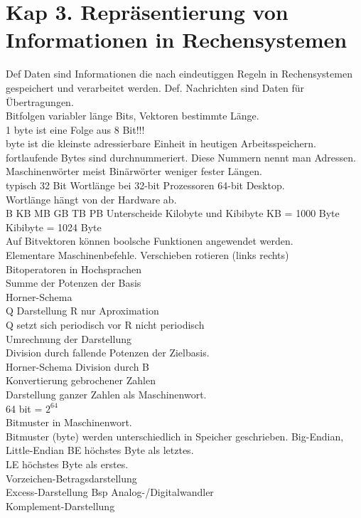\documentclass{article}
\begin{document}
	\section*{Kap 3. Repräsentierung von Informationen in Rechensystemen}
	Def Daten sind Informationen die nach eindeutiggen Regeln in Rechensystemen gespeichert und verarbeitet werden. 
	Def. Nachrichten sind Daten für Übertragungen.\\
	Bitfolgen variabler länge Bits, Vektoren bestimmte Länge. \\
	1 byte ist eine Folge aus 8 Bit!!! \\
	byte ist die kleinste adressierbare Einheit in heutigen Arbeitsspeichern. \\
	fortlaufende Bytes sind durchnummeriert. Diese Nummern nennt man Adressen. \\
	Maschinenwörter meist Binärwörter weniger fester Längen. \\
	typisch 32 Bit Wortlänge bei 32-bit Prozessoren 64-bit Desktop. \\
	Wortlänge hängt von der Hardware ab. \\
	B KB MB GB TB PB
	Unterscheide Kilobyte und Kibibyte
	KB = 1000 Byte Kibibyte = 1024 Byte \\
	Auf Bitvektoren können boolsche Funktionen angewendet werden. \\
	Elementare Maschinenbefehle. Verschieben rotieren (links rechts) \\
	Bitoperatoren in Hochsprachen \\

	Summe der Potenzen der Basis \\
	Horner-Schema \\
	Q Darstellung R nur Aproximation \\
	Q setzt sich periodisch vor R nicht periodisch \\
	Umrechnung der Darstellung \\
	Division durch fallende Potenzen der Zielbasis. \\
	Horner-Schema Division durch B \\
	Konvertierung gebrochener Zahlen \\
	Darstellung ganzer Zahlen als Maschinenwort. \\
	64 bit = $2^{64}$ \\
	Bitmuster in Maschinenwort. \\
	Bitmuster (byte) werden unterschiedlich in Speicher geschrieben. Big-Endian, Little-Endian
	BE höchstes Byte als letztes. \\
	LE höchstes Byte als erstes. \\
	Vorzeichen-Betragsdarstellung \\
	Excess-Darstellung Bsp Analog-/Digitalwandler \\
	Komplement-Darstellung \\
\end{document}
